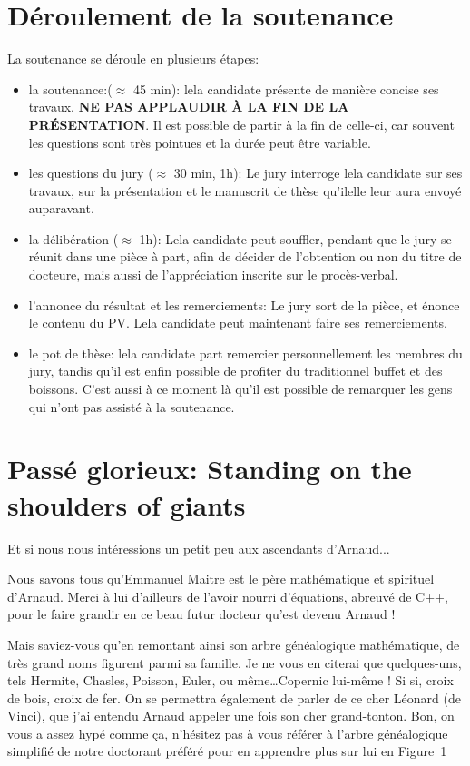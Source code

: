 \documentclass[a4paper]{leaflet}
\newcommand{\ei}{\textperiodcentered}
\begin{document}
\section*{Déroulement de la soutenance}
La soutenance se déroule en plusieurs étapes:
\begin{itemize}
\item la soutenance:($\approx$ 45 min):
  le\ei la candidat\ei e présente de manière concise ses travaux.  \textbf{NE PAS APPLAUDIR À LA FIN DE LA PRÉSENTATION}.  Il est possible de partir à la fin de celle-ci, car souvent les questions sont très pointues et la durée peut être variable.
\item les questions du jury ($\approx$ 30 min, 1h):
  Le jury interroge le\ei la candidat\ei e sur ses travaux, sur la présentation et le manuscrit de thèse qu'il\ei elle leur aura envoyé auparavant.
\item la délibération ($\approx$ 1h):
  Le\ei la candidat\ei e peut souffler, pendant que le jury se réunit dans une pièce à part, afin de décider de l'obtention ou non du titre de docteur\ei e, mais aussi de l'appréciation inscrite sur le procès-verbal.
\item l'annonce du résultat et les remerciements:
  Le jury sort de la pièce, et énonce le contenu du PV. Le\ei la candidat\ei e peut maintenant faire ses remerciements.
\item le pot de thèse:
  le\ei la candidat\ei e part remercier personnellement les membres du jury, tandis qu'il est enfin possible de profiter du traditionnel buffet et des boissons. C'est aussi à ce moment là qu'il est possible de remarquer les gens qui n'ont pas assisté à la soutenance.
\end{itemize}

\section*{Passé glorieux: Standing on the shoulders of giants}

Et si nous nous intéressions un petit peu aux ascendants d'Arnaud...

Nous savons tous qu'Emmanuel Maitre est le père mathématique et spirituel d'Arnaud. Merci à lui d'ailleurs de l'avoir nourri d'équations, abreuvé de C++, pour le faire grandir en ce beau futur docteur qu'est devenu Arnaud !

Mais saviez-vous qu'en remontant ainsi son arbre généalogique mathématique, de très grand noms figurent parmi sa famille. Je ne vous en citerai que quelques-uns, tels Hermite, Chasles, Poisson, Euler, ou même\dots Copernic lui-même ! Si si, croix de bois, croix de fer. On se permettra également de parler de ce cher Léonard (de Vinci), que j'ai entendu Arnaud appeler une fois son \og cher grand-tonton\fg. Bon, on vous a assez hypé comme ça, n'hésitez pas à vous référer à l'arbre généalogique simplifié de notre doctorant préféré pour en apprendre plus sur lui en Figure~1%
\end{document}
